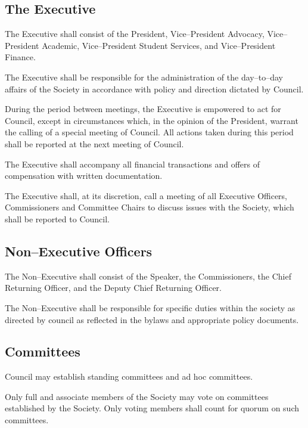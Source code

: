 \subsection{The Executive}
	\begin{longenum}[label*=\thesubsection.\arabic*., align=left]
	\item The Executive shall consist of the President, Vice--President Advocacy, Vice--President Academic, Vice--President Student Services, and Vice--President Finance. 
    \item The Executive shall be responsible for the administration of the day--to--day affairs of the Society in accordance with policy and direction dictated by Council.
    \item During the period between meetings, the Executive is empowered to act for Council, except in circumstances which, in the opinion of the President, warrant the calling of a special meeting of Council. All actions taken during this period shall be reported at the next meeting of Council.
    \item The Executive shall accompany all financial transactions and offers of compensation with written documentation.
        \item The Executive shall, at its discretion, call a
        meeting of all Executive Officers, Commissioners and Committee Chairs to discuss issues with the Society, which shall be reported to Council. 

 
\end{longenum}
\subsection{Non--Executive Officers}
	\begin{longenum}[label*=\thesubsection.\arabic*., align=left]
	\item The Non--Executive shall consist of the Speaker, the Commissioners, the Chief Returning Officer, and the Deputy Chief Returning Officer. 
    \item The Non--Executive shall be responsible for specific duties within the society as directed by council as reflected in the bylaws and appropriate policy documents.
\end{longenum}
\subsection{Committees}
	\begin{longenum}[label*=\thesubsection.\arabic*., align=left]
	\item Council may establish standing committees and ad hoc committees.
    \item Only full and associate members of the Society may vote on committees established by the Society. Only voting members shall count for quorum on such committees.
\end{longenum}
